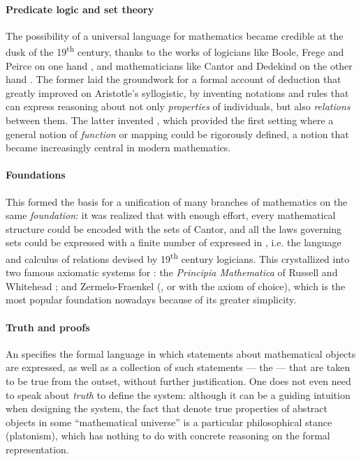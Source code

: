 \paragraph{Predicate logic and set theory}

\AP
The possibility of a universal language for mathematics became credible at the
dusk of the 19\textsuperscript{th} century, thanks to the works of logicians
like Boole, Frege and Peirce on one hand
, and mathematicians
like Cantor and Dedekind on the other hand
. The former laid the groundwork
for a formal account of deduction that greatly improved on Aristotle's
syllogistic, by inventing notations and rules that can express reasoning about
not only \emph{properties} of individuals, but also \emph{relations} between
them. The latter invented , which provided the first setting
where a general notion of \emph{function} or mapping could be rigorously
defined, a notion that became increasingly central in modern mathematics.

\paragraph{Foundations}

\AP
This formed the basis for a unification of many branches of mathematics on the
same \emph{foundation}: it was realized that with enough effort, every
mathematical structure could be encoded with the sets of Cantor, and all the
laws governing sets could be expressed with a finite number of 
expressed in , i.e. the language and calculus of
relations devised by 19\textsuperscript{th} century logicians. This crystallized
into two famous axiomatic systems for : the \textit{Principia
Mathematica} of Russell and Whitehead ; and Zermelo-Fraenkel
 (, or  with the axiom of choice), which is
the most popular foundation nowadays because of its greater simplicity.

\paragraph{Truth and proofs}

\AP
An  specifies the formal language in which statements
about mathematical objects are expressed, as well as a collection of such
statements --- the  --- that are taken to be true from the outset,
without further justification. One does not even need to speak about
\emph{truth} to define the system: although it can be a guiding intuition when
designing the system, the fact that  denote true properties of
abstract objects in some ``mathematical universe'' is a particular philosophical
stance (platonism), which has nothing to do with concrete reasoning on the
formal representation.

